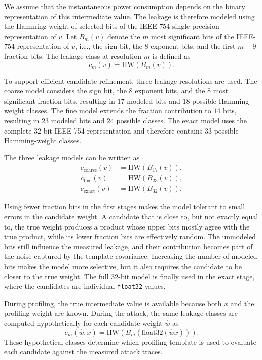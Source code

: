 \documentclass[conference]{IEEEtran}
\begin{document}
We assume that the instantaneous power consumption depends on the binary representation of this intermediate value.
The leakage is therefore modeled using the Hamming weight of selected bits of the IEEE-754 single-precision representation of $v$.
Let $B_m(v)$ denote the $m$ most significant bits of the IEEE-754 representation of $v$, i.e., the sign bit, the $8$ exponent bits, and the first $m-9$ fraction bits.
The leakage class at resolution $m$ is defined as
\begin{equation*}
	c_m(v)
	=
	\mathrm{HW}\left(B_m(v)\right).
\end{equation*}

To support efficient candidate refinement, three leakage resolutions are used.
The coarse model considers the sign bit, the $8$ exponent bits, and the $8$ most significant fraction bits, resulting in $17$ modeled bits and $18$ possible Hamming-weight classes.
The fine model extends the fraction contribution to $14$ bits, resulting in $23$ modeled bits and $24$ possible classes.
The exact model uses the complete $32$-bit IEEE-754 representation and therefore contains $33$ possible Hamming-weight classes.

The three leakage models can be written as
\begin{align*}
	c_{\mathrm{coarse}}(v)
	 & =
	\mathrm{HW}\left(B_{17}(v)\right), \\
	c_{\mathrm{fine}}(v)
	 & =
	\mathrm{HW}\left(B_{23}(v)\right), \\
	c_{\mathrm{exact}}(v)
	 & =
	\mathrm{HW}\left(B_{32}(v)\right).
\end{align*}

Using fewer fraction bits in the first stages makes the model tolerant to small errors in the candidate weight.
A candidate that is close to, but not exactly equal to, the true weight produces a product whose upper bits mostly agree with the true product, while its lower fraction bits are effectively random.
The unmodeled bits still influence the measured leakage, and their contribution becomes part of the noise captured by the template covariance.
Increasing the number of modeled bits makes the model more selective, but it also requires the candidate to be closer to the true weight.
The full $32$-bit model is finally used in the exact stage, where the candidates are individual \texttt{float32} values.

During profiling, the true intermediate value is available because both $x$ and the profiling weight are known.
During the attack, the same leakage classes are computed hypothetically for each candidate weight $\hat{w}$ as
\begin{equation*}
	c_m(\hat{w},x)
	=
	\mathrm{HW}
	\left(
	B_m\left(
		\mathrm{float32}(\hat{w}x)
		\right)
	\right).
\end{equation*}
These hypothetical classes determine which profiling template is used to evaluate each candidate against the measured attack traces.
\end{document}
